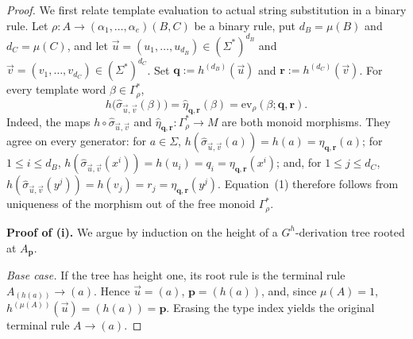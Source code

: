 \documentclass[11pt,a4paper]{article}
\theoremstyle{remark}
\newcommand{\ev}{\mathrm{ev}}
\newcommand{\tuple}[1]{\vec{#1}}
\begin{document}
\begin{proof}
We first relate template evaluation to actual string substitution in a binary
rule.  Let
\(\rho\colon A\to(\alpha_1,\ldots,\alpha_e)(B,C)\) be a binary rule, put
\(d_B=\mu(B)\) and \(d_C=\mu(C)\), and let
\(\tuple u=(u_1,\ldots,u_{d_B})\in(\Sigma^*)^{d_B}\) and
\(\tuple v=(v_1,\ldots,v_{d_C})\in(\Sigma^*)^{d_C}\).  Set
\(\mathbf q:=h^{(d_B)}(\tuple u)\) and
\(\mathbf r:=h^{(d_C)}(\tuple v)\).
For every template word \(\beta\in\Gamma_\rho^*\),
\[
  h\bigl(
    \widehat{\sigma}_{\tuple u,\tuple v}(\beta)
  \bigr)
  =
  \widehat{\eta}_{\mathbf q,\mathbf r}(\beta)
  =
  \ev_\rho(\beta;\mathbf q,\mathbf r).
  \tag{1}
\]
Indeed, the maps
\(h\circ\widehat{\sigma}_{\tuple u,\tuple v}\) and
\(\widehat{\eta}_{\mathbf q,\mathbf r}\colon\Gamma_\rho^*\to M\) are both
monoid morphisms.  They agree on every generator: for \(a\in\Sigma\),
\(h(\widehat{\sigma}_{\tuple u,\tuple v}(a))=h(a)
=\eta_{\mathbf q,\mathbf r}(a)\); for \(1\le i\le d_B\),
\(h(\widehat{\sigma}_{\tuple u,\tuple v}(x^i))=h(u_i)=q_i
=\eta_{\mathbf q,\mathbf r}(x^i)\); and, for \(1\le j\le d_C\),
\(h(\widehat{\sigma}_{\tuple u,\tuple v}(y^j))=h(v_j)=r_j
=\eta_{\mathbf q,\mathbf r}(y^j)\).
Equation~\textup{(1)} therefore follows from uniqueness of the morphism out of
the free monoid \(\Gamma_\rho^*\).

\medskip
\noindent
\textbf{Proof of (i).}
We argue by induction on the height of a \(G^h\)-derivation tree rooted at
\(A_{\mathbf p}\).

\smallskip
\noindent
\emph{Base case.}
If the tree has height one, its root rule is the terminal rule
\(A_{(h(a))}\to(a)\).  Hence \(\tuple u=(a)\),
\(\mathbf p=(h(a))\), and, since \(\mu(A)=1\),
\(h^{(\mu(A))}(\tuple u)=(h(a))=\mathbf p\).
Erasing the type index yields the original terminal rule \(A\to(a)\).


\end{proof}
\end{document}
